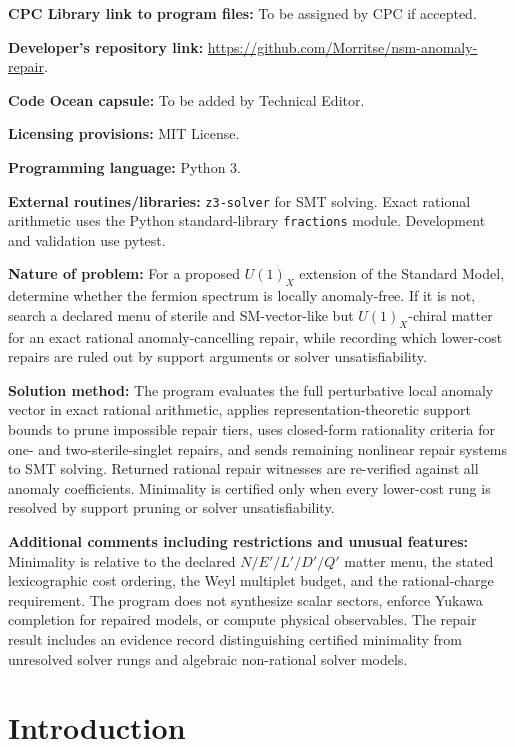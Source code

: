 \documentclass[11pt]{article}
\begin{document}
\noindent
\textbf{CPC Library link to program files:} To be assigned by CPC if accepted.

\noindent
\textbf{Developer's repository link:}
\url{https://github.com/Morritse/nsm-anomaly-repair}.

\noindent
\textbf{Code Ocean capsule:} To be added by Technical Editor.

\noindent
\textbf{Licensing provisions:} MIT License.

\noindent
\textbf{Programming language:} Python 3.

\noindent
\textbf{External routines/libraries:} \texttt{z3-solver} for SMT solving.
Exact rational arithmetic uses the Python standard-library \texttt{fractions}
module. Development and validation use pytest.

\noindent
\textbf{Nature of problem:} For a proposed \(U(1)_X\) extension of the Standard
Model, determine whether the fermion spectrum is locally anomaly-free. If it is
not, search a declared menu of sterile and SM-vector-like but
\(U(1)_X\)-chiral matter for an exact rational anomaly-cancelling repair, while
recording which lower-cost repairs are ruled out by support arguments or solver
unsatisfiability.

\noindent
\textbf{Solution method:} The program evaluates the full perturbative local
anomaly vector in exact rational arithmetic, applies representation-theoretic
support bounds to prune impossible repair tiers, uses closed-form rationality
criteria for one- and two-sterile-singlet repairs, and sends remaining nonlinear
repair systems to SMT solving. Returned rational repair witnesses are
re-verified against all anomaly coefficients. Minimality is certified only when
every lower-cost rung is resolved by support pruning or solver unsatisfiability.

\noindent
\textbf{Additional comments including restrictions and unusual features:}
Minimality is relative to the declared
\(N/E'/L'/D'/Q'\) matter menu, the stated lexicographic cost ordering, the Weyl
multiplet budget, and the rational-charge requirement. The program does not
synthesize scalar sectors, enforce Yukawa completion for repaired models, or
compute physical observables. The repair result includes an evidence record
distinguishing certified minimality from unresolved solver rungs and algebraic
non-rational solver models.

\section{Introduction}
\end{document}
